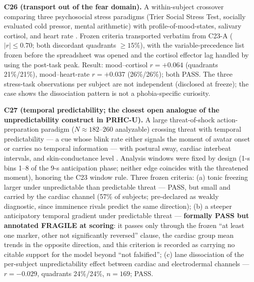 \documentclass[9pt,twocolumn]{article}
\begin{document}
\textbf{C26 (transport out of the fear domain).} A within-subject crossover comparing three psychosocial stress paradigms (Trier Social Stress Test, socially evaluated cold pressor, mental arithmetic) with profile-of-mood-states, salivary cortisol, and heart rate \cite{giles2015}. Frozen criteria transported verbatim from C23-A ($|r|\le0.70$; both discordant quadrants $\ge15\%$), with the variable-precedence list frozen before the spreadsheet was opened and the cortisol effector lag handled by using the post-task peak. Result: mood--cortisol $r=+0.064$ (quadrants 21\%/21\%), mood--heart-rate $r=+0.037$ (26\%/26\%); both PASS. The three stress-task observations per subject are not independent (disclosed at freeze); the case shows the dissociation pattern is not a phobia-specific curiosity.

\textbf{C27 (temporal predictability; the closest open analogue of the unpredictability construct in PRHC-U).} A large threat-of-shock action-preparation paradigm ($N{\approx}182$--$260$ analyzable) crossing threat with temporal predictability --- a cue whose blink rate either signals the moment of avatar onset or carries no temporal information --- with postural sway, cardiac interbeat intervals, and skin-conductance level \cite{koppold2026}. Analysis windows were fixed by design (1-s bins 1--8 of the 9-s anticipation phase; neither edge coincides with the threatened moment), honoring the C23 window rule. Three frozen criteria: (a) tonic freezing larger under unpredictable than predictable threat --- PASS, but small and carried by the cardiac channel (57\% of subjects; pre-declared as weakly diagnostic, since imminence rivals predict the same direction); (b) a steeper anticipatory temporal gradient under predictable threat --- \textbf{formally PASS but annotated FRAGILE at scoring}: it passes only through the frozen ``at least one marker, other not significantly reversed'' clause, the cardiac group mean trends in the opposite direction, and this criterion is recorded as carrying no citable support for the model beyond ``not falsified''; (c) lane dissociation of the per-subject unpredictability effect between cardiac and electrodermal channels --- $r=-0.029$, quadrants 24\%/24\%, $n=169$; PASS.
\end{document}

